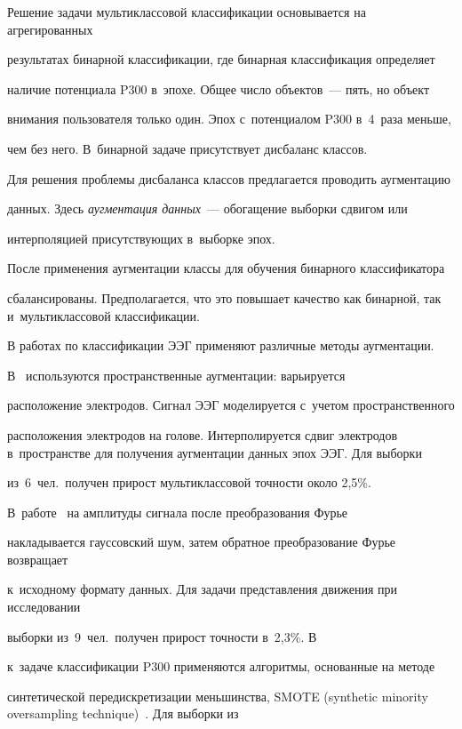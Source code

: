 Решение задачи мультиклассовой классификации основывается на агрегированных 

результатах бинарной классификации, где бинарная классификация определяет 

наличие потенциала P300 в~эпохе. Общее число объектов~--- пять, но объект 

внимания пользователя только один. Эпох с~потенциалом P300 в~4~раза меньше, 

чем без него. В~бинарной задаче присутствует дисбаланс классов.



Для решения проблемы дисбаланса классов предлагается проводить аугментацию 

данных. Здесь \textit{аугментация данных}~--- обогащение выборки сдвигом или 

интерполяцией присутствующих в~выборке эпох. %

После применения аугментации классы для обучения бинарного классификатора 

сбалансированы. Предполагается, что это повышает качество как бинарной, так и~мультиклассовой классификации.



В работах по классификации ЭЭГ применяют различные методы аугментации. 

В~\cite{Krell2017} используются пространственные аугментации: варьируется 

расположение электродов. Сигнал ЭЭГ моделируется с~учетом пространственного 

расположения электродов на голове. Интерполируется сдвиг электродов в~пространстве для получения аугментации данных эпох ЭЭГ. Для выборки 

из~6~чел.\ получен прирост мультиклассовой точности около 2,5\%. 

В~работе~\cite{Zhang2018} на амплитуды сигнала после преобразования Фурье 

накладывается гауссовский шум, затем обратное преобразование Фурье возвращает 

к~исходному формату данных. Для задачи представления движения при исследовании 

выборки из~9~чел.\ получен прирост точности в~2,3\%. В~\cite{Lee2020} 

к~задаче классификации P300 применяются алгоритмы, основанные на методе 

синтетической передискретизации меньшинства, SMOTE (synthetic minority oversampling technique)~\cite{smote}. Для выборки из 

